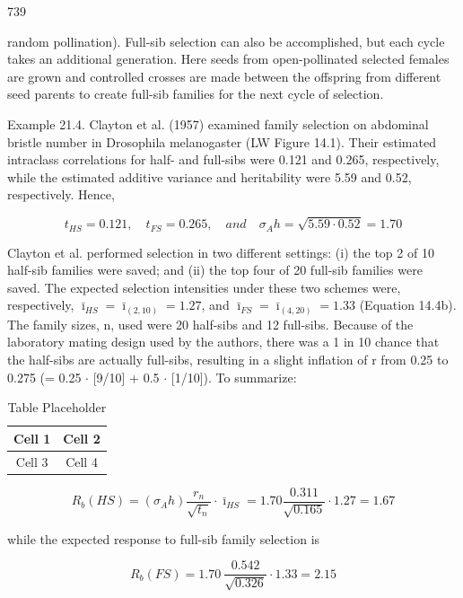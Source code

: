 \documentclass{article}
\begin{document}
739

random pollination). Full-sib selection can also be accomplished, but each cycle takes an additional generation. Here seeds from open-pollinated selected females are grown and controlled crosses are made between the offspring from different seed parents to create full-sib families for the next cycle of selection.

Example 21.4. Clayton et al. (1957) examined family selection on abdominal bristle number in Drosophila melanogaster (LW Figure 14.1). Their estimated intraclass correlations for half- and full-sibs were 0.121 and 0.265, respectively, while the estimated additive variance and heritability were 5.59 and 0.52, respectively. Hence,

\begin{equation}
t_{HS}=0.121,\quad t_{FS}=0.265,\quad and\quad\sigma_{A}h=\sqrt{5.59\cdot0.52}=1.70
\end{equation}

Clayton et al. performed selection in two different settings: (i) the top 2 of 10 half-sib families were saved; and (ii) the top four of 20 full-sib families were saved. The expected selection intensities under these two schemes were, respectively,  $ \bar{\imath}_{HS} = \bar{\imath}_{(2,10)} = 1.27 $, and  $ \bar{\imath}_{FS} = \bar{\imath}_{(4,20)} = 1.33 $ (Equation 14.4b). The family sizes, n, used were 20 half-sibs and 12 full-sibs. Because of the laboratory mating design used by the authors, there was a 1 in 10 chance that the half-sibs are actually full-sibs, resulting in a slight inflation of r from 0.25 to 0.275 (= 0.25  $ \cdot $ [9/10] + 0.5  $ \cdot $ [1/10]). To summarize:

\begin{table}[h]
\centering
\begin{tabular}{|c|c|}
\hline
Cell 1 & Cell 2 \\
\hline
Cell 3 & Cell 4 \\
\hline
\end{tabular}
\caption{Table Placeholder}
\end{table}

\begin{equation}
R_{b}(HS)=(\sigma_{A}h)\frac{r_{n}}{\sqrt{t_{n}}}\cdot\bar{\imath}_{HS}=1.70\frac{0.311}{\sqrt{0.165}}\cdot1.27=1.67
\end{equation}

while the expected response to full-sib family selection is

\begin{equation}
R_{b}(FS)=1.70\ \frac{0.542}{\sqrt{0.326}}\cdot1.33=2.15
\end{equation}
\end{document}
